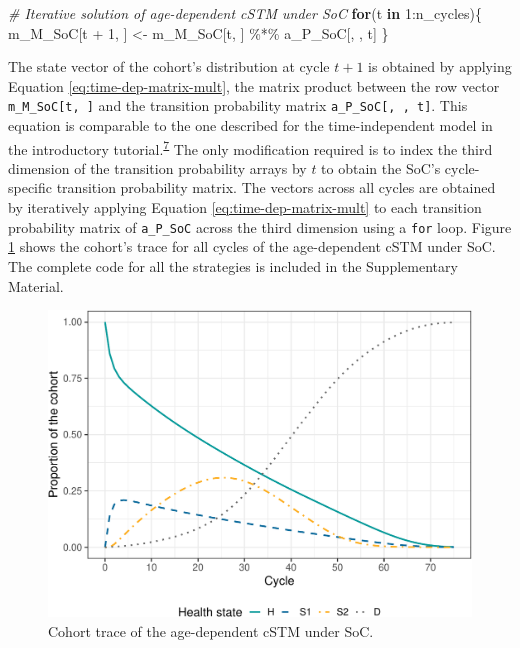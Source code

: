 \documentclass[
]{article}
\newenvironment{Shaded}{\begin{snugshade}}{\end{snugshade}}
\newcommand{\CommentTok}[1]{\textcolor[rgb]{0.56,0.35,0.01}{\textit{#1}}}
\newcommand{\ControlFlowTok}[1]{\textcolor[rgb]{0.13,0.29,0.53}{\textbf{#1}}}
\newcommand{\DecValTok}[1]{\textcolor[rgb]{0.00,0.00,0.81}{#1}}
\newcommand{\NormalTok}[1]{#1}
\newcommand{\OtherTok}[1]{\textcolor[rgb]{0.56,0.35,0.01}{#1}}
\newcommand{\SpecialCharTok}[1]{\textcolor[rgb]{0.00,0.00,0.00}{#1}}
\begin{document}
\begin{Shaded}
\begin{Highlighting}[]
\CommentTok{\# Iterative solution of age{-}dependent cSTM under SoC}
\ControlFlowTok{for}\NormalTok{(t }\ControlFlowTok{in} \DecValTok{1}\SpecialCharTok{:}\NormalTok{n\_cycles)\{}
\NormalTok{  m\_M\_SoC[t }\SpecialCharTok{+} \DecValTok{1}\NormalTok{, ] }\OtherTok{\textless{}{-}}\NormalTok{ m\_M\_SoC[t, ] }\SpecialCharTok{\%*\%}\NormalTok{ a\_P\_SoC[, , t]}
\NormalTok{\}}
\end{Highlighting}
\end{Shaded}

The state vector of the cohort's distribution at cycle \(t+1\) is obtained by applying Equation \eqref{eq:time-dep-matrix-mult}, the matrix product between the row vector \texttt{m\_M\_SoC{[}t,\ {]}} and the transition probability matrix \texttt{a\_P\_SoC{[},\ ,\ t{]}}. This equation is comparable to the one described for the time-independent model in the introductory tutorial.\textsuperscript{\protect\hyperlink{ref-Alarid-Escudero2022b}{7}} The only modification required is to index the third dimension of the transition probability arrays by \(t\) to obtain the SoC's cycle-specific transition probability matrix. The vectors across all cycles are obtained by iteratively applying Equation \eqref{eq:time-dep-matrix-mult} to each transition probability matrix of \texttt{a\_P\_SoC} across the third dimension using a \texttt{for} loop. Figure \ref{fig:Sick-Sicker-Trace-AgeDep} shows the cohort's trace for all cycles of the age-dependent cSTM under SoC. The complete code for all the strategies is included in the Supplementary Material.

\begin{figure}[H]

{\centering \includegraphics{figs/Sick-Sicker-Trace-AgeDep-1} 

}

\caption{Cohort trace of the age-dependent cSTM under SoC.}\label{fig:Sick-Sicker-Trace-AgeDep}
\end{figure}
\end{document}
